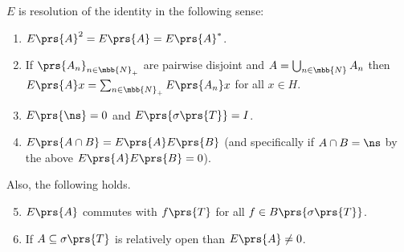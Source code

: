 \documentclass[10pt, twoside]{book}
\begin{document}
\begin{proposition}
$E$ is resolution of the identity in the following sense:
\begin{enumerate}
\item $E\prs{A}^2 = E\prs{A} = E\prs{A}^*$.
\item If $\prs{A_n}_{n \in \mbb{N}_+}$ are pairwise disjoint and $A = \bigcup_{n \in \mbb{N}} A_n$ then $E\prs{A}x = \sum_{n \in \mbb{N}_+} E\prs{A_n} x$ for all $x \in H$.
\item $E\prs{\ns} = 0$ and $E\prs{\sigma\prs{T}} = I$.
\item $E\prs{A \cap B} = E\prs{A} E\prs{B}$ (and specifically if $A \cap B = \ns$ by the above $E\prs{A} E\prs{B} = 0$).
\end{enumerate}

Also, the following holds.
\begin{enumerate}
\setcounter{enumi}{4}
\item $E\prs{A}$ commutes with $f\prs{T}$ for all $f \in B\prs{\sigma\prs{T}}$.
\item If $A \subseteq \sigma\prs{T}$ is relatively open than $E\prs{A} \neq 0$.
\end{enumerate}
\end{proposition}
\end{document}

